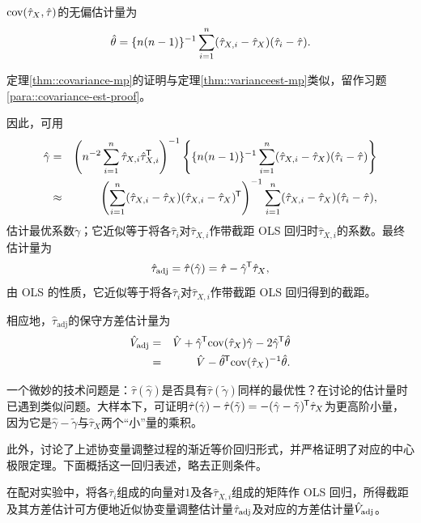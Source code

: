 \begin{theorem}\label{thm::covariance-mp}
$\textup{cov}( \hat{\tau}_X ,  \hat{\tau}  )$的无偏估计量为
$$
\hat{\theta} = \{n(n-1)  \}^{-1} \sum_{i=1}^n ( \hat{\tau}_{X,i}  -  \hat{\tau}_{X} ) (   \hat{\tau}_i -  \hat{\tau}   ).
$$
\end{theorem}

定理\ref{thm::covariance-mp}的证明与定理\ref{thm::varianceest-mp}类似，留作习题\ref{para::covariance-est-proof}。 


因此，可用
\begin{eqnarray*}
\hat{\gamma} &=&  \left( n^{-2} \sum_{i=1}^n \hat{\tau}_{X,i}   \hat{\tau}_{X,i}  ^{\mkern-1.5mu\mathsf{T}}  \right)^{-1}
\left\{ \{n(n-1)  \}^{-1} \sum_{i=1}^n (\hat{\tau}_{X,i}  -  \hat{\tau}_X )(   \hat{\tau}_i -  \hat{\tau}   ) \right\} \\
&\approx &  \left(  \sum_{i=1}^n(  \hat{\tau}_{X,i}   - \hat{\tau}_X ) ( \hat{\tau}_{X,i}  -  \hat{\tau}_X  )^{\mkern-1.5mu\mathsf{T}}  \right)^{-1}
  \sum_{i=1}^n (\hat{\tau}_{X,i}  -  \hat{\tau}_X ) (   \hat{\tau}_i -  \hat{\tau}   )  ,
\end{eqnarray*}
估计最优系数$\tilde{\gamma}$；它近似等于将各$\hat{\tau}_i $对$\hat{\tau}_{X,i} $作带截距 OLS 回归时$\hat{\tau}_{X,i}$的系数。最终估计量为
$$
\hat{\tau}_{\text{adj}} = 
\hat{\tau}( \hat{\gamma} ) = \hat{\tau} - \hat{\gamma} ^{\mkern-1.5mu\mathsf{T}} \hat{\tau}_X  ,
$$
由 OLS 的性质，它近似等于将各$\hat{\tau}_i $对$\hat{\tau}_{X,i} $作带截距 OLS 回归得到的截距。


相应地，$\hat{\tau}_{\text{adj}} $的保守方差估计量为
\begin{eqnarray*}
\hat{V} _{\text{adj}} 
&=& 
\hat{V} + \hat \gamma^{\mkern-1.5mu\mathsf{T}} \textup{cov}(\hat{\tau}_X   ) \hat \gamma - 2 \hat \gamma^{\mkern-1.5mu\mathsf{T}} \hat \theta  \\
&=& \hat{V}  - \hat \theta ^{\mkern-1.5mu\mathsf{T}} \textup{cov}(\hat{\tau}_X   ) ^{-1}    \hat \theta .
\end{eqnarray*}


一个微妙的技术问题是：$\hat\tau(\hat\gamma)$是否具有$\hat\tau(\tilde\gamma)$同样的最优性？在讨论\citet{lin2013}的估计量时已遇到类似问题。大样本下，可证明$\hat\tau(\hat\gamma) - \hat\tau(\tilde\gamma) =  - (\hat\gamma - \tilde\gamma)^{\mkern-1.5mu\mathsf{T}} \hat{\tau}_X $为更高阶小量，因为它是$\hat\gamma - \tilde\gamma$与$\hat{\tau}_X$两个“小”量的乘积。 


此外，\citet{fogarty2018regression}讨论了上述协变量调整过程的渐近等价回归形式，并严格证明了对应的中心极限定理。下面概括这一回归表述，略去正则条件。 


\begin{proposition}\label{prop::colin2018regression}
在配对实验中，将各$\hat{\tau}_i $组成的向量对$1$及各$\hat{\tau}_{X,i} $组成的矩阵作 OLS 回归，所得截距及其方差估计可方便地近似协变量调整估计量$\hat{\tau}_{\textup{adj}} $及对应的方差估计量$\hat{V} _{\textup{adj}}$。 
\end{proposition}


